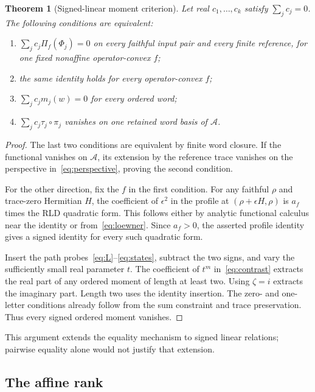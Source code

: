 \documentclass[11pt,a4paper]{article}
\newtheorem{theorem}{Theorem}[section]
\theoremstyle{definition}\newtheorem{definition}[theorem]{Definition}
\newcommand{\Alg}{\mathcal A}
\begin{document}
\begin{theorem}[Signed-linear moment criterion]\label{thm:linear}
Let real $c_1,\ldots,c_k$ satisfy $\sum_jc_j=0$. The following conditions are equivalent:
\begin{enumerate}
\item $\sum_jc_j\Pi_f(\Phi_j)=0$ on every faithful input pair and every finite reference, for one fixed nonaffine operator-convex $f$;
\item the same identity holds for every operator-convex $f$;
\item $\sum_jc_jm_j(w)=0$ for every ordered word;
\item $\sum_jc_j\tau_j\circ\pi_j$ vanishes on one retained word basis of $\Alg$.
\end{enumerate}
\end{theorem}
\begin{proof}
The last two conditions are equivalent by finite word closure. If the functional vanishes on $\Alg$, its extension by the reference trace vanishes on the perspective in~\eqref{eq:perspective}, proving the second condition.

For the other direction, fix the $f$ in the first condition. For any faithful $\rho$ and trace-zero Hermitian $H$, the coefficient of $\epsilon^2$ in the profile at $(\rho+\epsilon H,\rho)$ is $a_f$ times the RLD quadratic form. This follows either by analytic functional calculus near the identity or from~\eqref{eq:loewner}. Since $a_f>0$, the asserted profile identity gives a signed identity for every such quadratic form.

Insert the path probes~\eqref{eq:L}--\eqref{eq:states}, subtract the two signs, and vary the sufficiently small real parameter $t$. The coefficient of $t^m$ in~\eqref{eq:contrast} extracts the real part of any ordered moment of length at least two. Using $\zeta=i$ extracts the imaginary part. Length two uses the identity insertion. The zero- and one-letter conditions already follow from the sum constraint and trace preservation. Thus every signed ordered moment vanishes.
\end{proof}

This argument extends the equality mechanism to signed linear relations; pairwise equality alone would not justify that extension.

\subsection{The affine rank}
\end{document}
